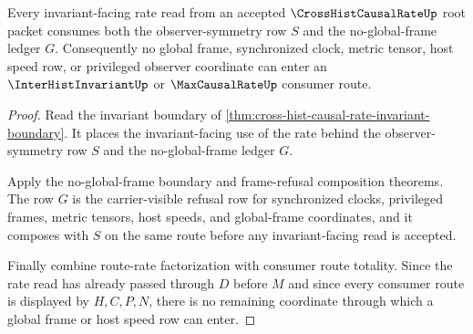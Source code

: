 \begin{theorem}
\label{thm:cross-hist-causal-rate-root-frame-refusal-exactness}
Every invariant-facing rate read from an accepted $\CrossHistCausalRateUp$ root packet consumes both the observer-symmetry row $S$ and the no-global-frame ledger $G$. Consequently no global frame, synchronized clock, metric tensor, host speed row, or privileged observer coordinate can enter an $\InterHistInvariantUp$ or $\MaxCausalRateUp$ consumer route.
\end{theorem}
\begin{proof}
Read the invariant boundary of \autoref{thm:cross-hist-causal-rate-invariant-boundary}. It places the invariant-facing use of the rate behind the observer-symmetry row $S$ and the no-global-frame ledger $G$.

Apply the no-global-frame boundary and frame-refusal composition theorems. The row $G$ is the carrier-visible refusal row for synchronized clocks, privileged frames, metric tensors, host speeds, and global-frame coordinates, and it composes with $S$ on the same route before any invariant-facing read is accepted.

Finally combine route-rate factorization with consumer route totality. Since the rate read has already passed through $D$ before $M$ and since every consumer route is displayed by $H,C,P,N$, there is no remaining coordinate through which a global frame or host speed row can enter.
\end{proof}

